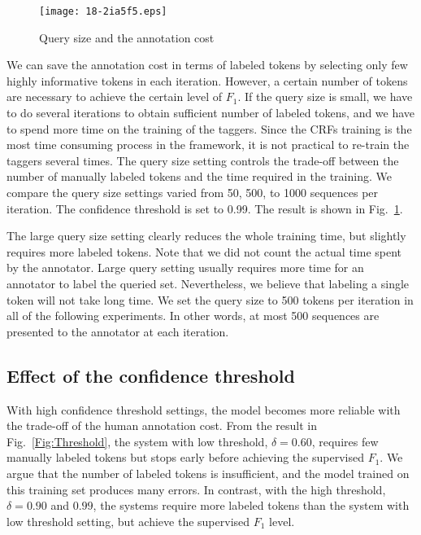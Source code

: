 \documentclass[english]{jnlp_JS2.0}
\begin{document}
\begin{figure}[b]
\begin{center}
\texttt{[image: 18-2ia5f5.eps]}
\end{center}
\caption{Query size and the annotation cost}
\label{Fig:QuerySize}
\end{figure}

We can save the annotation cost in terms of labeled tokens by selecting only few highly informative tokens in each iteration. However, a certain number of tokens are necessary to achieve the certain level of $F_1$. If the query size is small, we have to do several iterations to obtain sufficient number of labeled tokens, and we have to spend more time on the training of the taggers. Since the CRFs training is the most time consuming process in the framework, it is not practical to re-train the taggers several times. The query size setting controls the trade-off between the number of manually labeled tokens and the time required in the training. We compare the query size settings varied from 50, 500, to 1000 sequences per iteration. The confidence threshold is set to 0.99. The result is shown in Fig.~\ref{Fig:QuerySize}.

The large query size setting clearly reduces the whole training time, but slightly requires more labeled tokens. Note that we did not count the actual time spent by the annotator. Large query setting usually requires more time for an annotator to label the queried set. Nevertheless, we believe that labeling a single token will not take long time. We set the query size to 500 tokens per iteration in all of the following experiments. In other words, at most 500 sequences are presented to the annotator at each iteration.


\subsection{Effect of the confidence threshold}
\label{Sec:Threshold}

With high confidence threshold settings, the model becomes more reliable with the trade-off of the human annotation cost. From the result in Fig.~\ref{Fig:Threshold}, the system with low threshold, $\delta=0.60$, requires few manually labeled tokens but stops early before achieving the supervised $F_1$. We argue that the number of labeled tokens is insufficient, and the model trained on this training set produces many errors. In contrast, with the high threshold, $\delta=0.90$ and $0.99$, the systems require more labeled tokens than the system with low threshold setting, but achieve the supervised $F_1$ level.
\end{document}
